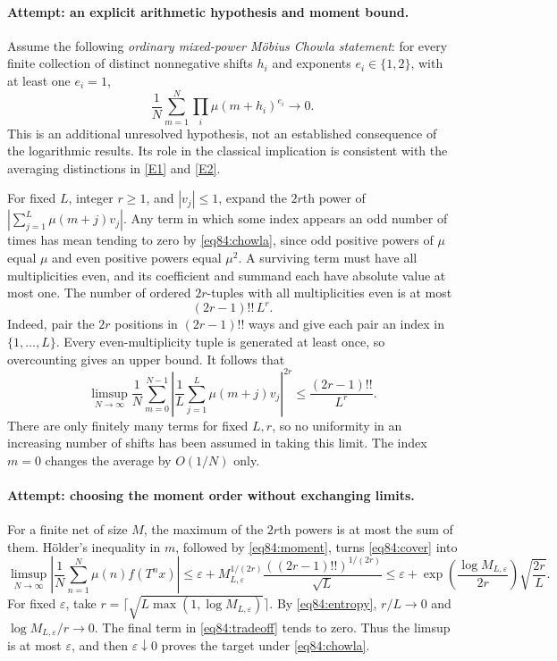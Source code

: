 \documentclass[11pt,a4paper]{article}
\numberwithin{equation}{section}
\newcommand{\eref}[2]{\hyperlink{extra:#1:#2}{[E#2]}}
\begin{document}
\paragraph{Attempt: an explicit arithmetic hypothesis and moment bound.}
Assume the following \emph{ordinary mixed-power M\"obius Chowla statement}:
for every finite collection of distinct nonnegative shifts $h_i$ and
exponents $e_i\in\{1,2\}$, with at least one $e_i=1$,
\begin{equation}\label{eq84:chowla}
 \frac1N\sum_{m=1}^N\prod_i\mu(m+h_i)^{e_i}\longrightarrow0.
\end{equation}
This is an additional unresolved hypothesis, not an established consequence
of the logarithmic results. Its role in the classical implication is
consistent with the averaging distinctions in \eref{30002209}{1} and
\eref{30002209}{2}.

For fixed $L$, integer $r\geq1$, and $|v_j|\leq1$, expand the $2r$th
power of $|\sum_{j=1}^L\mu(m+j)v_j|$. Any term in which some index appears
an odd number of times has mean tending to zero by \eqref{eq84:chowla},
since odd positive powers of $\mu$ equal $\mu$ and even positive powers
equal $\mu^2$. A surviving term must have all multiplicities even, and
its coefficient and summand each have absolute value at most one.
The number of ordered $2r$-tuples with all multiplicities even is at most
\[
 (2r-1)!!\,L^r.
\]
Indeed, pair the $2r$ positions in $(2r-1)!!$ ways and give each pair an
index in $\{1,\ldots,L\}$. Every even-multiplicity tuple is generated at
least once, so overcounting gives an upper bound. It follows that
\begin{equation}\label{eq84:moment}
 \limsup_{N\to\infty}\frac1N\sum_{m=0}^{N-1}
 \left|\frac1L\sum_{j=1}^L\mu(m+j)v_j\right|^{2r}
 \leq\frac{(2r-1)!!}{L^r}.
\end{equation}
There are only finitely many terms for fixed $L,r$, so no uniformity in
an increasing number of shifts has been assumed in taking this limit.
The index $m=0$ changes the average by $O(1/N)$ only.

\paragraph{Attempt: choosing the moment order without exchanging limits.}
For a finite net of size $M$, the maximum of the $2r$th powers is at most
the sum of them. H\"older's inequality in $m$, followed by
\eqref{eq84:moment}, turns \eqref{eq84:cover} into
\begin{equation}\label{eq84:tradeoff}
 \limsup_{N\to\infty}\left|\frac1N\sum_{n=1}^N
                      \mu(n)f(T^nx)\right|
 \leq\varepsilon+
 M_{L,\varepsilon}^{1/(2r)}
       \frac{((2r-1)!!)^{1/(2r)}}{\sqrt L}
 \leq\varepsilon+
 \exp\left(\frac{\log M_{L,\varepsilon}}{2r}\right)
                      \sqrt{\frac{2r}{L}}.
\end{equation}
For fixed $\varepsilon$, take
$r=\lceil\sqrt{L\max(1,\log M_{L,\varepsilon})}\rceil$.
By \eqref{eq84:entropy}, $r/L\to0$ and
$\log M_{L,\varepsilon}/r\to0$. The final term in
\eqref{eq84:tradeoff} tends to zero. Thus the limsup is at most
$\varepsilon$, and then $\varepsilon\downarrow0$ proves the target
under \eqref{eq84:chowla}.
\end{document}
